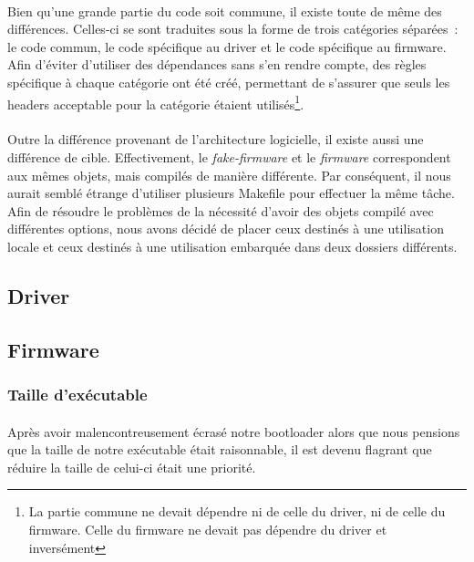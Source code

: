 \paragraph{}
Bien qu'une grande partie du code soit commune, il existe toute de même des
différences. Celles-ci se sont traduites sous la forme de trois catégories
séparées~:
le code commun, le code spécifique au driver et le code spécifique au firmware.
Afin d'éviter d'utiliser des dépendances sans s'en rendre compte, des règles
spécifique à chaque catégorie ont été créé, permettant de s'assurer que seuls
les headers acceptable pour la catégorie étaient utilisés\footnote{La partie
commune ne devait dépendre ni de celle du driver, ni de celle du firmware. Celle
du firmware ne devait pas dépendre du driver et inversément}.

\paragraph{}
Outre la différence provenant de l'architecture logicielle, il existe aussi une
différence de cible. Effectivement, le {\em fake-firmware} et le {\em firmware}
correspondent aux mêmes objets, mais compilés de manière différente. Par
conséquent, il nous aurait semblé étrange d'utiliser plusieurs Makefile pour
effectuer la même tâche. Afin de résoudre le problèmes de la nécessité d'avoir
des objets compilé avec différentes options, nous avons décidé de placer ceux
destinés à une utilisation locale et ceux destinés à une utilisation embarquée
dans deux dossiers différents.

\subsection{Driver}

\subsection{Firmware}

\subsubsection{Taille d'exécutable}
\paragraph{}
Après avoir malencontreusement écrasé notre bootloader alors que nous pensions
que la taille de notre exécutable était raisonnable, il est devenu flagrant que
réduire la taille de celui-ci était une priorité.

